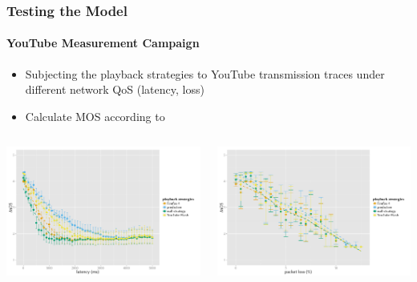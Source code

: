 \documentclass{beamer}
\begin{document}
\begin{frame}
	\frametitle{Testing the Model}
	\framesubtitle{YouTube Measurement Campaign}

	\begin{itemize}
		\item Subjecting the playback strategies to YouTube transmission traces under different network QoS (latency, loss)
		\item Calculate MOS according to \cite{hossfeld2013youtubeqoe}
	\end{itemize}

	\begin{columns}[T]
			\centering
			\includegraphics[width=\columnwidth]{../../chapters/03-streaming/images/R-playbackemulation-qoe-latency.pdf}
		
			\centering
			\includegraphics[width=\columnwidth]{../../chapters/03-streaming/images/R-playbackemulation-qoe-loss.pdf}
	\end{columns}


\end{frame}
\end{document}
